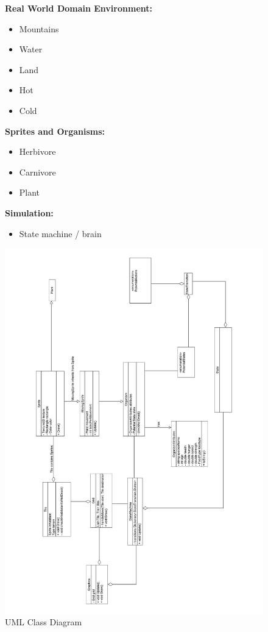 \documentclass[a4paper, oneside, 11pt]{report}
\begin{document}
{\begin{figure}[H]
	\textbf{Real World Domain Environment:}
	\begin{itemize}
		\item Mountains
		\item Water
		\item Land
		\item Hot
		\item Cold
	\end{itemize}
	
	\textbf{Sprites and Organisms:}
	\begin{itemize}
		\item Herbivore 
		\item Carnivore 
		\item Plant
	\end{itemize}
	
	\textbf{Simulation:}
	\begin{itemize}
		\item State machine / brain
	\end{itemize}
\end{figure}

\begin{figure}[H]
	\caption{UML Class Diagram}\label{classdiagram}
	\includegraphics[width=\textwidth]{class-diagram}
\end{figure}

}
\end{document}
